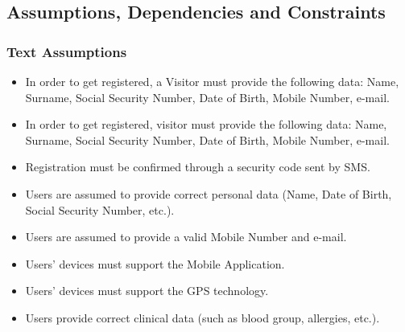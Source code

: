 \documentclass[12pt,a4paper]{article}
\begin{document}
	\subsection{Assumptions, Dependencies and Constraints}
	\subsubsection{Text Assumptions}
	\begin{itemize}
		\item In order to get registered, a Visitor must provide the following data: Name, Surname, Social Security Number, Date of Birth, Mobile Number, e-mail.
		\item In order to get registered, visitor must provide the following data: Name, Surname, Social Security Number, Date of Birth, Mobile Number, e-mail.
		\item Registration must be confirmed through a security code sent by SMS.
		\item Users are assumed to provide correct personal data (Name, Date of Birth, Social Security Number, etc.).
		\item Users are assumed to provide a valid Mobile Number and e-mail.
		\item Users' devices must support the Mobile Application.
		\item Users' devices must support the GPS technology.
		\item Users provide correct clinical data (such as blood group, allergies, etc.).
	\end{itemize}
\end{document}

